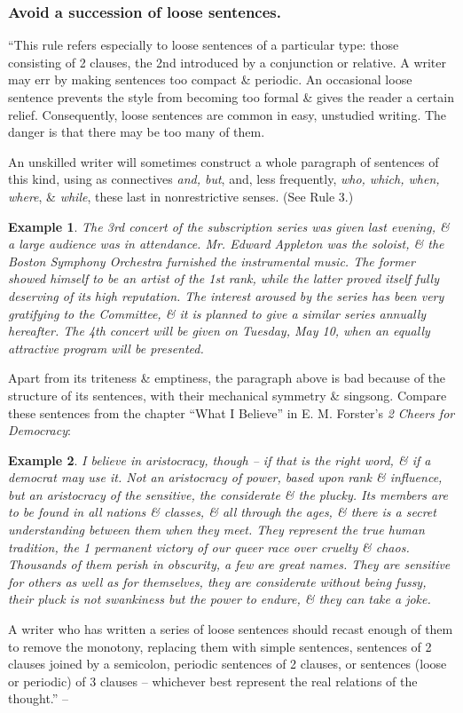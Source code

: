 \documentclass{article}
\newtheorem{example}{Example}
\begin{document}

\subsubsection{Avoid a succession of loose sentences.}
``This rule refers especially to loose sentences of a particular type: those consisting of 2 clauses, the 2nd introduced by a conjunction or relative. A writer may err by making sentences too compact \& periodic. An occasional loose sentence prevents the style from becoming too formal \& gives the reader a certain relief. Consequently, loose sentences are common in easy, unstudied writing. The danger is that there may be too many of them.

An unskilled writer will sometimes construct a whole paragraph of sentences of this kind, using as connectives {\it and, but}, and, less frequently, {\it who, which, when, where}, \& {\it while}, these last in nonrestrictive senses. (See Rule 3.)
\begin{example}
	The 3rd concert of the subscription series was given last evening, \& a large audience was in attendance. Mr. Edward Appleton was the soloist, \& the Boston Symphony Orchestra furnished the instrumental music. The former showed himself to be an artist of the 1st rank, while the latter proved itself fully deserving of its high reputation. The interest aroused by the series has been very gratifying to the Committee, \& it is planned to give a similar series annually hereafter. The 4th concert will be given on Tuesday, May 10, when an equally attractive program will be presented.
\end{example}
Apart from its triteness \& emptiness, the paragraph above is bad because of the structure of its sentences, with their mechanical symmetry \& singsong. Compare these sentences from the chapter ``What I Believe'' in E. M. Forster's {\it 2 Cheers for Democracy}:
\begin{example}
	I believe in aristocracy, though -- if that is the right word, \& if a democrat may use it. Not an aristocracy of power, based upon rank \& influence, but an aristocracy of the sensitive, the considerate \& the plucky. Its members are to be found in all nations \& classes, \& all through the ages, \& there is a secret understanding between them when they meet. They represent the true human tradition, the 1 permanent victory of our queer race over cruelty \& chaos. Thousands of them perish in obscurity, a few are great names. They are sensitive for others as well as for themselves, they are considerate without being fussy, their pluck is not swankiness but the power to endure, \& they can take a joke.
\end{example}
A writer who has written a series of loose sentences should recast enough of them to remove the monotony, replacing them with simple sentences, sentences of 2 clauses joined by a semicolon, periodic sentences of 2 clauses, or sentences (loose or periodic) of 3 clauses -- whichever best represent the real relations of the thought.'' -- \cite[pp. 39--40]{Strunk_White_element_style}
\end{document}
